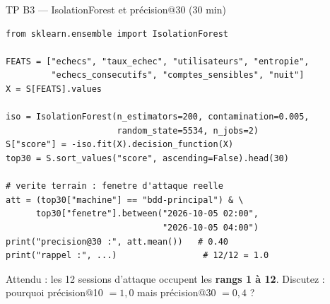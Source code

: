 \begin{frame}[fragile]{TP B3 --- IsolationForest et précision@30 (30 min)}
\begin{codebox}
\begin{lstlisting}
from sklearn.ensemble import IsolationForest

FEATS = ["echecs", "taux_echec", "utilisateurs", "entropie",
         "echecs_consecutifs", "comptes_sensibles", "nuit"]
X = S[FEATS].values

iso = IsolationForest(n_estimators=200, contamination=0.005,
                      random_state=5534, n_jobs=2)
S["score"] = -iso.fit(X).decision_function(X)
top30 = S.sort_values("score", ascending=False).head(30)

# verite terrain : fenetre d'attaque reelle
att = (top30["machine"] == "bdd-principal") & \
      top30["fenetre"].between("2026-10-05 02:00",
                               "2026-10-05 04:00")
print("precision@30 :", att.mean())   # 0.40
print("rappel :", ...)                 # 12/12 = 1.0
\end{lstlisting}
\end{codebox}
\vspace{1mm}
\begin{center}\small
Attendu : les 12 sessions d'attaque occupent les \textbf{rangs 1 à 12}.
Discutez : pourquoi précision@10 $= 1{,}0$ mais précision@30 $= 0{,}4$ ?
\end{center}
\end{frame}


